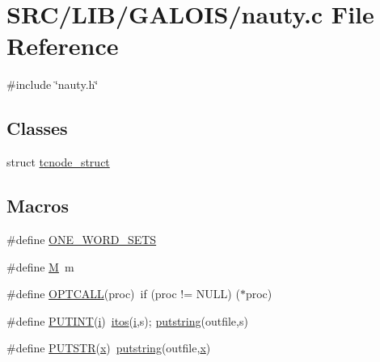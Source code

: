 \hypertarget{_l_i_b_2_g_a_l_o_i_s_2nauty_8_c}{}\section{S\+R\+C/\+L\+I\+B/\+G\+A\+L\+O\+I\+S/nauty.c File Reference}
\label{_l_i_b_2_g_a_l_o_i_s_2nauty_8_c}
{\ttfamily \#include \char`\"{}nauty.\+h\char`\"{}}\newline
\subsection*{Classes}
\begin{DoxyCompactItemize}
\item 
struct \mbox{\hyperlink{structtcnode__struct}{tcnode\+\_\+struct}}
\end{DoxyCompactItemize}
\subsection*{Macros}
\begin{DoxyCompactItemize}
\item 
\#define \mbox{\hyperlink{_l_i_b_2_g_a_l_o_i_s_2nauty_8_c_a2d0442c6641916fecbcb3749301f733f}{O\+N\+E\+\_\+\+W\+O\+R\+D\+\_\+\+S\+E\+TS}}
\item 
\#define \mbox{\hyperlink{_l_i_b_2_g_a_l_o_i_s_2nauty_8_c_a52037c938e3c1b126c6277da5ca689d0}{M}}~m
\item 
\#define \mbox{\hyperlink{_l_i_b_2_g_a_l_o_i_s_2nauty_8_c_af415aeb26c58068a870e07153a5911b1}{O\+P\+T\+C\+A\+LL}}(proc)~if (proc != N\+U\+LL) ($\ast$proc)
\item 
\#define \mbox{\hyperlink{_l_i_b_2_g_a_l_o_i_s_2nauty_8_c_a5311dff60fb902900b1860147a8c5bfd}{P\+U\+T\+I\+NT}}(\mbox{\hyperlink{alphabet2_8_c_acb559820d9ca11295b4500f179ef6392}{i}})~\mbox{\hyperlink{nauty_8h_ac1a92b8d9b36d29e9bfe98aedce648fe}{itos}}(\mbox{\hyperlink{alphabet2_8_c_acb559820d9ca11295b4500f179ef6392}{i}},s); \mbox{\hyperlink{nauty_8h_a6ee02b4468c4dd676a70971fa9d5bee5}{putstring}}(outfile,s)
\item 
\#define \mbox{\hyperlink{_l_i_b_2_g_a_l_o_i_s_2nauty_8_c_a8a0a05cbe53aca08281546cbc9fac1bb}{P\+U\+T\+S\+TR}}(\mbox{\hyperlink{alphabet2_8_c_a6150e0515f7202e2fb518f7206ed97dc}{x}})~\mbox{\hyperlink{nauty_8h_a6ee02b4468c4dd676a70971fa9d5bee5}{putstring}}(outfile,\mbox{\hyperlink{alphabet2_8_c_a6150e0515f7202e2fb518f7206ed97dc}{x}})
\end{DoxyCompactItemize}
